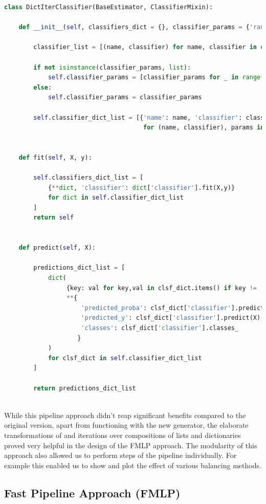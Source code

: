 \begin{lstlisting}[language=Python, numbers=none]
class DictIterClassifier(BaseEstimator, ClassifierMixin):

    def __init__(self, classifiers_dict = {}, classifier_params = {'random_state': 42}):

        classifier_list = [(name, classifier) for name, classifier in classifiers_dict.items()]

        if not isinstance(classifier_params, list):
            self.classifier_params = [classifier_params for _ in range(len(classifier_list))]
        else:
            self.classifier_params = classifier_params

        self.classifier_dict_list = [{'name': name, 'classifier': classifier(**params)}
                                      for (name, classifier), params in zip(classifier_list, self.classifier_params)]


    def fit(self, X, y):
        
        self.classifiers_dict_list = [
            {**dict, 'classifier': dict['classifier'].fit(X,y)} 
            for dict in self.classifier_dict_list
        ]
        return self
    

    def predict(self, X):
            
        predictions_dict_list = [
            dict(
                 {key: val for key,val in clsf_dict.items() if key != 'classifier'},
                 **{
                     'predicted_proba': clsf_dict['classifier'].predict_proba(X),
                     'predicted_y': clsf_dict['classifier'].predict(X),
                     'classes': clsf_dict['classifier'].classes_
                    }
            )
            for clsf_dict in self.classifier_dict_list
        ]
        
        return predictions_dict_list
        
\end{lstlisting}

While this pipeline approach didn't reap significant benefits compared to the original version, apart from functioning with the new generator, 
the elaborate transformations of and iterations over compositions of lists and dictionaries proved very helpful in the design of the FMLP approach.
The modularity of this approach also allowed us to perform steps of the pipeline individually.
For example this enabled us to show and plot the effect of various balancing methods.

\subsection{Fast Pipeline Approach (FMLP)}


